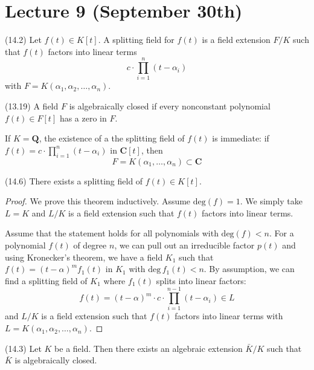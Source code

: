 \section{Lecture 9 (September 30th)}
\begin{defi}
(14.2) Let $f(t)\in K[t]$. A splitting field for $f(t)$ is a field extension $F/K$ such that $f(t)$ factors into linear terms 
\[c\cdot \prod ^{n}_{i=1}(t-\alpha _{i})\]
with $F=K(\alpha_1,\alpha_2,\ldots ,\alpha _{n})$. 
\end{defi}
\vspace{2ex}
\begin{defi}
(13.19) A field $F$ is  algebraically closed if every nonconstant polynomial $f(t)\in F[t]$ has a zero in $F$.
\end{defi}
\vspace{2ex}
\begin{rmk}
If $K={\bm Q}$, the existence of a the splitting field of $f(t)$ is immediate: if $f(t)=c\cdot \prod^{n}_{i=1}(t-\alpha _{i})$ in ${\bm C}[t]$, then
\[F=K(\alpha_1,\ldots ,\alpha _{n})\subset {\bm C}\]
\end{rmk}
\vspace{2ex}
\begin{thm}
(14.6) There exists a splitting field of $f(t)\in K[t]$. 
\end{thm}
\vspace{2ex}
\begin{proof}
We prove this theorem inductively. Assume $\mathrm{deg}(f)=1$. We simply take $L=K$ and $L/K$ is a field extension such that $f(t)$ factors into linear terms. 

\bigskip

Assume that the statement holds for all polynomials with $\mathrm{deg}(f)< n$. For a polynomial $f(t)$ of degree $n$, we can pull out an irreducible factor $p(t)$ and using Kronecker's theorem, we have a field $K_1$ such that $f(t)=(t-\alpha )^{m}f_1(t)$ in $K_1$ with $\mathrm{deg}\,f_1(t)< n$. By assumption, we can find a splitting field of $K_1$ where $f_1(t)$ splits into linear factors:
\[f(t)=(t-\alpha )^{m}\cdot c\cdot \prod^{n-1}_{i=1}(t-\alpha _{i})\in L\]
and $L/K$ is a field extension such that $f(t)$ factors into linear terms with $L=K(\alpha_1,\alpha_2,\ldots ,\alpha_{n})$.
\end{proof}
\vspace{2ex}
\begin{thm}
(14.3) Let $K$ be a field. Then there exists an algebraic extension $\bar{K}/K$ such that $\bar{K}$ is algebraically closed.
\begin{center}
\end{center}
\end{thm}
